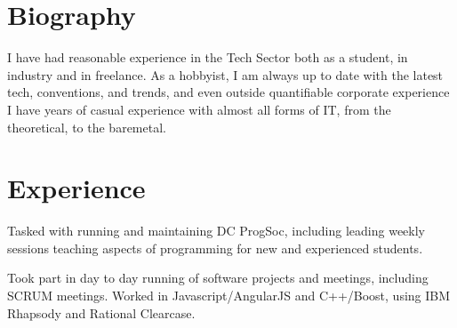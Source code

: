 \documentclass[a4paper]{cv}
\begin{document}
\hfill
%
%
\begin{minipage}[t]{0.66\textwidth} %

\section{Biography}

I have had reasonable experience in the Tech Sector both as a student, in industry and in freelance. As a hobbyist, I am always up to date with the latest tech, conventions, and trends, and even outside quantifiable corporate experience I have years of casual experience with almost all forms of IT, from the theoretical, to the baremetal.

\sectionspace


\section{Experience}


\vspace{\topsep} %
\begin{tightitemize}
\item\small Tasked with running and maintaining DC ProgSoc, including leading weekly sessions teaching aspects of programming for new and experienced students.
\end{tightitemize}

\sectionspace %



\sectionspace %


\vspace{\topsep} %
\begin{tightitemize}
\item\small Took part in day to day running of software projects and meetings, including SCRUM meetings. Worked in Javascript/AngularJS and C++/Boost, using IBM Rhapsody and Rational Clearcase.
\end{tightitemize}


\end{minipage}
\end{document}
